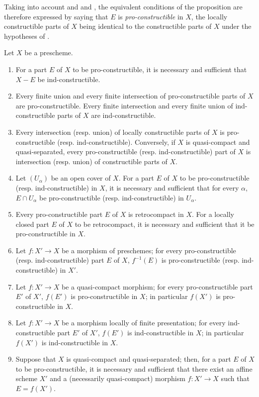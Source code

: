 Taking into account  and  and , the equivalent conditions of the proposition  are therefore expressed by saying that $E$ is \emph{pro-constructible} in $X$, the locally constructible parts of $X$ being identical to the constructible parts of $X$ under the hypotheses of .


\begin{proposition}[1.9.5]
\label{IV.1.9.5}
Let $X$ be a prescheme.
\begin{enumerate}
  \item[\rm(i)] For a part $E$ of $X$ to be pro-constructible, it is necessary and sufficient that $X-E$ be ind-constructible.
  \item[\rm(ii)] Every finite union and every finite intersection of pro-constructible parts of $X$ are pro-constructible.
  Every finite intersection and every finite union of ind-constructible parts of $X$ are ind-constructible.
  \item[\rm(iii)] Every intersection (resp. union) of locally constructible parts of $X$ is pro-constructible (resp. ind-constructible).
  Conversely, if $X$ is quasi-compact and quasi-separated, every pro-constructible (resp. ind-constructible) part of $X$ is intersection (resp. union) of constructible parts of $X$.
  \item[\rm(iv)] Let $(U_\alpha)$ be an open cover of $X$.
  For a part $E$ of $X$ to be pro-constructible (resp. ind-constructible) in $X$, it is necessary and sufficient that for every $\alpha$, $E\cap U_\alpha$ be pro-constructible (resp. ind-constructible) in $U_\alpha$.
  \item[\rm(v)] Every pro-constructible part $E$ of $X$ is retrocompact in $X$.
  For a locally closed part $E$ of $X$ to be retrocompact, it is necessary and sufficient that it be pro-constructible in $X$.
  \item[\rm(vi)] Let $f:X'\to X$ be a morphism of preschemes; for every pro-constructible (resp. ind-constructible) part $E$ of $X$, $f^{-1}(E)$ is pro-constructible (resp. ind-constructible) in $X'$.
  \item[\rm(vii)] Let $f:X'\to X$ be a quasi-compact morphism; for every pro-constructible part $E'$ of $X'$, $f(E')$ is pro-constructible in $X$; in particular $f(X')$ is pro-constructible in $X$.
  \item[\rm(viii)] Let $f:X'\to X$ be a morphism locally of finite presentation; for every ind-constructible part $E'$ of $X'$, $f(E')$ is ind-constructible in $X$; in particular $f(X')$ is ind-constructible in $X$.
  \item[\rm(ix)] Suppose that $X$ is quasi-compact and quasi-separated; then, for a part $E$ of $X$ to be pro-constructible, it is necessary and sufficient that there exist an affine scheme $X'$ and a (necessarily quasi-compact) morphism $f:X'\to X$ such that $E=f(X')$.
\end{enumerate}
\end{proposition}

